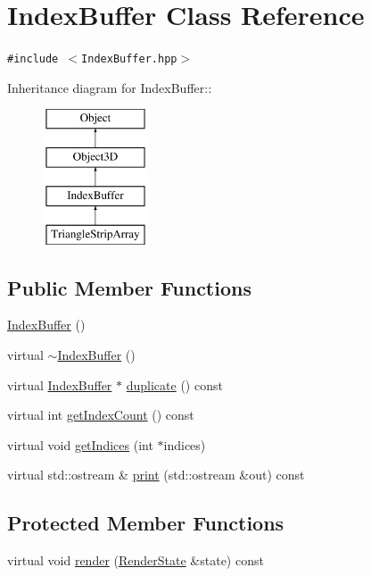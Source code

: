 \hypertarget{classm3g_1_1IndexBuffer}{
\section{IndexBuffer Class Reference}
\label{classm3g_1_1IndexBuffer}
}
{\tt \#include $<$IndexBuffer.hpp$>$}

Inheritance diagram for IndexBuffer::\begin{figure}[H]
\begin{center}
\leavevmode
\includegraphics[height=4cm]{classm3g_1_1IndexBuffer}
\end{center}
\end{figure}
\subsection*{Public Member Functions}
\begin{CompactItemize}
\item 
\hyperlink{classm3g_1_1IndexBuffer_d2e68a2d7c6c753d3abfeef42ee79427}{IndexBuffer} ()
\item 
virtual \hyperlink{classm3g_1_1IndexBuffer_ac7952364fe4d2d7b2731da5380c841c}{$\sim$IndexBuffer} ()
\item 
virtual \hyperlink{classm3g_1_1IndexBuffer}{IndexBuffer} $\ast$ \hyperlink{classm3g_1_1IndexBuffer_fab6fc0a0ec393e527f849c3af10ad76}{duplicate} () const 
\item 
virtual int \hyperlink{classm3g_1_1IndexBuffer_fe9ae2993ebcdb93d5ff26d57c81b73e}{getIndexCount} () const 
\item 
virtual void \hyperlink{classm3g_1_1IndexBuffer_650953afac45099025a524ab160b911f}{getIndices} (int $\ast$indices)
\item 
virtual std::ostream \& \hyperlink{classm3g_1_1IndexBuffer_6fea17fa1532df3794f8cb39cb4f911f}{print} (std::ostream \&out) const 
\end{CompactItemize}
\subsection*{Protected Member Functions}
\begin{CompactItemize}
\item 
virtual void \hyperlink{classm3g_1_1IndexBuffer_8babc8a79b78615da51161e94029eea9}{render} (\hyperlink{structm3g_1_1RenderState}{RenderState} \&state) const 
\end{CompactItemize}
